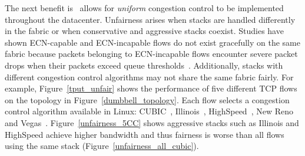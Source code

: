 The next benefit is~\acdc{} allows for {\em uniform}
congestion control to be implemented throughout the datacenter.
Unfairness arises when stacks are handled differently in the fabric or when conservative and aggressive
stacks coexist. Studies have shown ECN-capable and ECN-incapable flows do not exist gracefully on the
same fabric because packets belonging to ECN-incapable flows encounter severe packet drops when their packets
exceed queue thresholds~\cite{wu2012tuning,judd2015nsdi}. %
Additionally, stacks with different congestion control algorithms may not share the same fabric fairly.
For example, Figure~\ref{tput_unfair} shows the performance of five different TCP flows on the topology in
Figure~\ref{dumbbell_topology}. Each flow selects a congestion control algorithm available in Linux:
CUBIC~\cite{ha2008cubic}, Illinois~\cite{liu2008tcp}, HighSpeed~\cite{RFC3649},
New Reno~\cite{RFC3782} and Vegas~\cite{Brakmo1994}.
Figure~\ref{unfairness_5CC} shows aggressive stacks such as Illinois and HighSpeed
achieve higher bandwidth and thus fairness is worse than all flows using the
same stack (Figure~\ref{unfairness_all_cubic}). 

